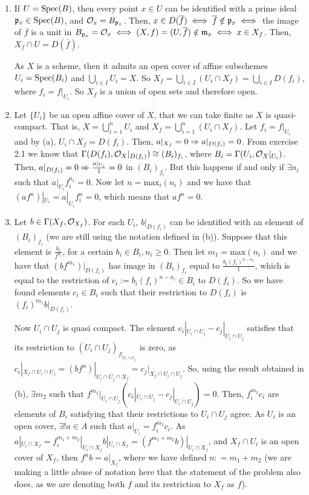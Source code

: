 \begin{sol}
	\begin{enumerate}[label=\alph*)]
		\item If $U = \mathrm{Spec}(B)$, then every point $x \in U$ can be identified with a prime ideal $\mathfrak{p}_x \in \mathrm{Spec}(B)$, and $\mathcal{O}_{x} = B_{\mathfrak{p}_x}$. Then, $x \in D(\overline{f}) \iff \overline{f} \notin \mathfrak{p}_x \iff$ the image of $\overline{f}$ is a unit in $B_{\mathfrak{p}_x} = \mathcal{O}_{x} \iff (X,f) = (U, \overline{f}) \notin \mathfrak{m}_x \iff x \in X_f$. Then, $X_f \cap U = D(\overline{f})$.

		As $X$ is a scheme, then it admits an open cover of affine subschemes $U_i = \mathrm{Spec}(B_i)$ and $\bigcup_{i \in I} U_i = X$. So $X_f = \bigcup_{i \in I} (U_i \cap X_f) = \bigcup_{i \in I} D(f_i)$, where $f_i = f|_{U_i}$. So $X_f$ is a union of open sets and therefore open.

		\item Let $\{U_i\}$ be an open affine cover of $X$, that we can take finite as $X$ is quasi-compact. That is, $X = \bigcup_{i = 1}^n U_i$ and $X_f = \bigcup_{i = 1}^n(U_i \cap X_f)$. Let $f_i = f|_{U_i}$ and by (a), $U_i \cap X_f = D(f_i)$. Then, $a|_{X_f} = 0 \Rightarrow a|_{D(f_i)} = 0$. From exercise 2.1 we know that $\Gamma(D(f_i), \mathcal{O}_X|_{D(f_i)}) \cong (B_i)_{f_i}$, where $B_i = \Gamma(U_i, \mathcal{O}_X|_{U_i})$. Then, $a|_{D(f_i)} = 0 \Rightarrow \frac{a|_{U_i}}{1} = 0$ in $(B_i)_{f_i}$. But this happens if and only if $\exists n_i$ such that $a|_{U_i}f_i^{n_i} = 0$. Now let $n = \mathrm{max}_i(n_i)$ and we have that $(af^n)|_{U_i} = a|_{U_i}f_i^{n} = 0$, which means that $af^n = 0$.

		\item Let $b \in \Gamma(X_f, \mathcal{O}_{X_f})$. For each $U_i$, $b|_{D(f_i)}$ can be identified with an element of $(B_i)_{f_i}$ (we are still using the notation defined in (b)). Suppose that this element is $\frac{b_i}{f^{n_i}}$, for a certain $b_i \in B_i, n_i \geq 0$. Then let $m_1 = \mathrm{max}(n_i)$ and we have that $(bf^{m_1})|_{D(f_i)}$ has image in $(B_i)_{f_i}$ equal to $\frac{b_i (f_i)^{n-n_i}}{1}$, which is equal to the restriction of $c_i := b_i (f_i)^{n-n_i} \in B_i$ to $D(f_i)$. So we have found elements $c_i \in B_i$ such that their restriction to $D(f_i)$ is $(f_i)^{m_1}b|_{D(f_i)}$.

		Now $U_i \cap U_j$ is quasi compact. The element $c_i|_{U_i \cap U_j} - c_j|_{U_i \cap U_j}$ satisfies that its restriction to $(U_i \cap U_j)_{f|_{U_i \cap U_j}}$ is zero, as $c_i|_{X_f \cap U_i \cap U_j} = (bf^n)|_{U_i \cap U_j \cap X_f} = c_j|_{X_f \cap U_i \cap U_j}$. So, using the result obtained in (b), $\exists m_2$ such that $f^{m_2}|_{U_i \cap U_j}(c_i|_{U_i \cap U_j} - c_j|_{U_i \cap U_j}) = 0$. Then, $f_i^{m_2}c_i$ are elements of $B_i$ satisfying that their restrictions to $U_i \cap U_j$ agree. As $U_i$ is an open cover, $\exists! a \in A$ such that $a|_{U_i} = f_i^{m_2}c_i$. As $a|_{U_i \cap X_f} = f_i^{m_1 + m_2}|_{U_i \cap X_f}b|_{U_i \cap X_f} = (f^{m_1+m_2}b)|_{U_i \cap X_f}$, and $X_f \cap U_i$ is an open cover of $X_f$, then $f^{n}b = a|_{X_f}$, where we have defined $n: = m_1 + m_2$ (we are making a little abuse of notation here that the statement of the problem also does, as we are denoting both $f$ and its restriction to $X_f$ as $f$).


\end{enumerate}
\end{sol}
